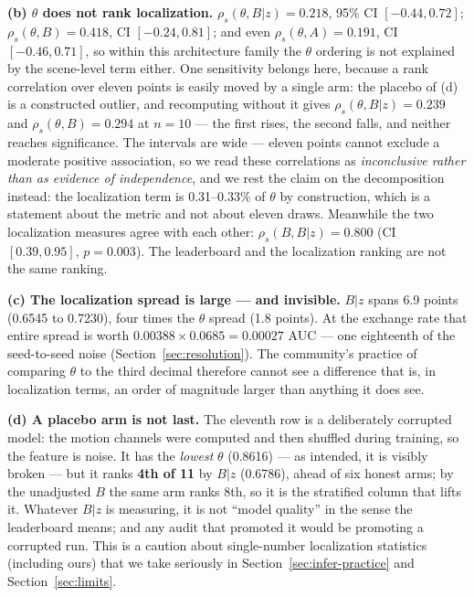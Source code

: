 \documentclass[number,preprint,12pt]{elsarticle}
\begin{document}
\textbf{(b) \(\theta\) does not rank localization.} \(\rho_s(\theta,B|z)=0.218\), 95\%
CI \([-0.44,0.72]\); \(\rho_s(\theta,B)=0.418\), CI \([-0.24,0.81]\); and even
\(\rho_s(\theta,A)=0.191\), CI \([-0.46,0.71]\), so within this architecture family
the \(\theta\) ordering is not explained by the scene-level term either. One
sensitivity belongs here, because a rank correlation over eleven points is
easily moved by a single arm: the placebo of (d) is a constructed outlier, and
recomputing without it gives \(\rho_s(\theta,B|z)=0.239\) and
\(\rho_s(\theta,B)=0.294\) at \(n=10\) --- the first rises, the second falls, and
neither reaches significance. The
intervals are wide --- eleven points cannot exclude a moderate positive
association, so we read these correlations as \emph{inconclusive rather than as
evidence of independence}, and we rest the claim on the decomposition instead:
the localization term is 0.31--0.33\% of \(\theta\) by construction, which is a
statement about the metric and not about eleven draws. Meanwhile the two
localization measures agree with each other:
\(\rho_s(B,B|z)=0.800\) (CI \([0.39,0.95]\), \(p=0.003\)). The leaderboard and the
localization ranking are not the same ranking.

\textbf{(c) The localization spread is large --- and invisible.} \(B|z\) spans 6.9 points
(0.6545 to 0.7230), four times the \(\theta\) spread (1.8 points). At the exchange rate
that entire spread is worth \(0.00388\times0.0685=0.00027\) AUC --- one eighteenth of
the seed-to-seed noise (Section~\ref{sec:resolution}). The community's practice of comparing \(\theta\) to the
third decimal therefore cannot see a difference that is, in localization terms,
an order of magnitude larger than anything it does see.

\textbf{(d) A placebo arm is not last.} The eleventh row is a deliberately corrupted
model: the motion channels were computed and then shuffled during training, so
the feature is noise. It has the \emph{lowest} \(\theta\) (0.8616) --- as intended, it is
visibly broken --- but it ranks \textbf{4th of 11} by \(B|z\) (0.6786), ahead of six
honest arms; by the unadjusted \(B\) the same arm ranks 8th, so it is the
stratified column that lifts it. Whatever \(B|z\) is measuring, it is not ``model quality'' in the sense
the leaderboard means; and any audit that promoted it would be promoting a
corrupted run. This is a caution about single-number localization statistics
(including ours) that we take seriously in Section~\ref{sec:infer-practice} and Section~\ref{sec:limits}.
\end{document}
